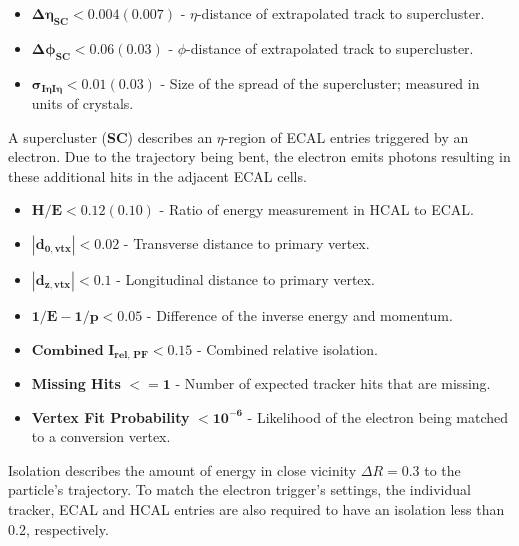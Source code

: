 \begin{itemize}
\item $\mathbf{\Delta \eta_{\textbf{SC}} < 0.004 (0.007)}$ - $\eta$-distance of extrapolated track to supercluster.
\item $\mathbf{\Delta \phi_{\textbf{SC}} < 0.06 (0.03)}$ - $\phi$-distance of extrapolated track to supercluster.
\item $\mathbf{\sigma_{I\eta I\eta} < 0.01 (0.03)}$ - Size of the spread of the supercluster; measured in units of crystals.
\end{itemize}

A supercluster (\textbf{SC}) describes an $\eta$-region of ECAL entries triggered by an electron. Due to the trajectory being bent, the electron emits photons resulting in these additional hits in the adjacent ECAL cells.

\begin{itemize}
\item $\mathbf{H / E < 0.12 (0.10)}$ - Ratio of energy measurement in HCAL to ECAL.
\item $\mathbf{|d_{0, \textbf{vtx}}| < 0.02}$ - Transverse distance to primary vertex. 
\item $\mathbf{|d_{z, \textbf{vtx}}| < 0.1}$ - Longitudinal distance to primary vertex.
\item $\mathbf{1/E - 1/p < 0.05}$ - Difference of the inverse energy and momentum.
\item $\mathbf{\textbf{Combined I}_{\textbf{rel, PF}} < 0.15}$ - Combined relative isolation.
\item \textbf{Missing Hits} $\mathbf{<= 1}$ - Number of expected tracker hits that are missing.
\item \textbf{Vertex Fit Probability} $\mathbf{< 10^{-6}}$ - Likelihood of the electron being matched to a conversion vertex.
\end{itemize}

Isolation describes the amount of energy in close vicinity $\Delta R = 0.3$ to the particle's trajectory. To match the electron trigger's settings, the individual tracker, ECAL and HCAL entries are also required to have an isolation less than 0.2, respectively.

